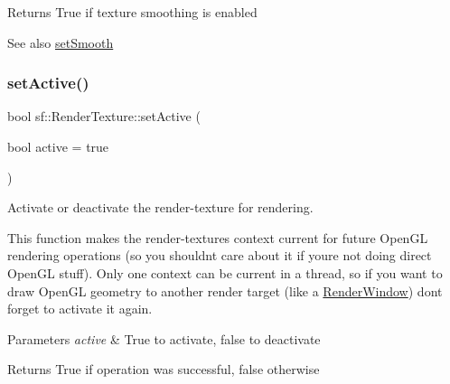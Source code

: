 \begin{DoxyReturn}{Returns}
True if texture smoothing is enabled
\end{DoxyReturn}
\begin{DoxySeeAlso}{See also}
\mbox{\hyperlink{classsf_1_1_render_texture_af08991e63c6020865dd07b20e27305b6}{set\+Smooth}} \begin{DoxyVerb}\end{DoxyVerb}
 
\end{DoxySeeAlso}
\mbox{\label{classsf_1_1_render_texture_a5da95ecdbce615a80bb78399012508cf}} 
\subsubsection{\texorpdfstring{setActive()}{setActive()}}
{\footnotesize\ttfamily bool sf\+::\+Render\+Texture\+::set\+Active (\begin{DoxyParamCaption}\item[{bool}]{active = {\ttfamily true} }\end{DoxyParamCaption})\hspace{0.3cm}{\ttfamily [virtual]}}



Activate or deactivate the render-\/texture for rendering. 

This function makes the render-\/texture\textquotesingle{}s context current for future Open\+GL rendering operations (so you shouldn\textquotesingle{}t care about it if you\textquotesingle{}re not doing direct Open\+GL stuff). Only one context can be current in a thread, so if you want to draw Open\+GL geometry to another render target (like a \mbox{\hyperlink{classsf_1_1_render_window}{Render\+Window}}) don\textquotesingle{}t forget to activate it again.


\begin{DoxyParams}{Parameters}
{\em active} & True to activate, false to deactivate\\
\hline
\end{DoxyParams}
\begin{DoxyReturn}{Returns}
True if operation was successful, false otherwise \begin{DoxyVerb}\end{DoxyVerb}
 
\end{DoxyReturn}


